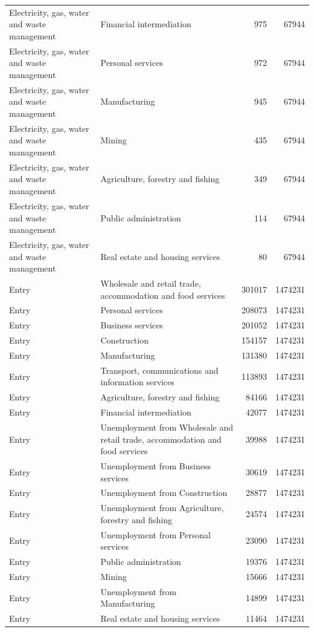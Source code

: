 \begin{longtable}{llrr}
Electricity, gas, water and waste management & Financial intermediation & 975 & 67944 \\
Electricity, gas, water and waste management & Personal services & 972 & 67944 \\
Electricity, gas, water and waste management & Manufacturing & 945 & 67944 \\
Electricity, gas, water and waste management & Mining & 435 & 67944 \\
Electricity, gas, water and waste management & Agriculture, forestry and fishing & 349 & 67944 \\
Electricity, gas, water and waste management & Public administration & 114 & 67944 \\
Electricity, gas, water and waste management & Real estate and housing services & 80 & 67944 \\
Entry & Wholesale and retail trade, accommodation and food services & 301017 & 1474231 \\
Entry & Personal services & 208073 & 1474231 \\
Entry & Business services & 201052 & 1474231 \\
Entry & Construction & 154157 & 1474231 \\
Entry & Manufacturing & 131380 & 1474231 \\
Entry & Transport, communications and information services & 113893 & 1474231 \\
Entry & Agriculture, forestry and fishing & 84166 & 1474231 \\
Entry & Financial intermediation & 42077 & 1474231 \\
Entry & Unemployment from Wholesale and retail trade, accommodation and food services & 39988 & 1474231 \\
Entry & Unemployment from Business services & 30619 & 1474231 \\
Entry & Unemployment from Construction & 28877 & 1474231 \\
Entry & Unemployment from Agriculture, forestry and fishing & 24574 & 1474231 \\
Entry & Unemployment from Personal services & 23090 & 1474231 \\
Entry & Public administration & 19376 & 1474231 \\
Entry & Mining & 15666 & 1474231 \\
Entry & Unemployment from Manufacturing & 14899 & 1474231 \\
Entry & Real estate and housing services & 11464 & 1474231 \\

\end{longtable}
